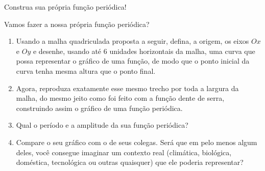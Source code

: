 \begin{task}{Construa sua própria função periódica!}
\label{trig-ativ5}

Vamos fazer a nossa própria função periódica?

\begin{enumerate}
\item Usando a malha quadriculada proposta a seguir, defina, a origem, os eixos $Ox$ e $Oy$ e desenhe, usando até $6$ unidades horizontais da malha, uma curva que possa representar o gráfico de uma função, de modo que o ponto inicial da curva tenha mesma altura que o ponto final.
\item Agora, reproduza exatamente esse mesmo trecho por toda a largura da malha, do mesmo jeito como foi feito com a função dente de serra, construindo assim o gráfico de uma função periódica.
\item Qual o período e a amplitude da sua função periódica?
\item Compare o seu gráfico com o de seus colegas. Será que em pelo menos algum deles, você consegue imaginar um contexto real (climática, biológica, doméstica, tecnológica ou outras quaisquer) que ele poderia representar?

\end{enumerate}


\begin{figure}[H]
\centering



\end{figure}
\end{task}

